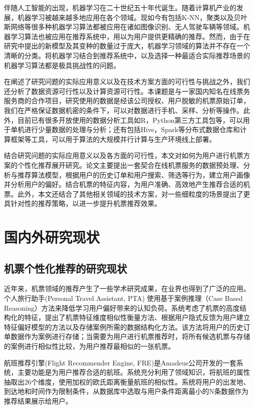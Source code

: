 伴随人工智能的出现，机器学习在二十世纪五十年代诞生。随着计算机产业的发展，机器学习被越来越多地应用在各个领域。现如今有包括K-NN，聚类以及贝叶斯网络等很多种机器学习算法都被应用在诸如图像识别、无人驾驶车辆等领域。机器学习算法也被应用在推荐系统中，用以为用户提供更精确的推荐。然而，由于在研究中提出的新模型及其变种的数量过于庞大，机器学习领域的算法并不存在一个清晰的分类。将机器学习结合到推荐系统中，以及选择一种最适合实际推荐场景的机器学习算法都是极具挑战性的问题。

在阐述了研究问题的实际应用意义以及在技术方案方面的可行性与挑战之外，我们还分析了数据资源可行性以及计算资源可行性。本课题是与一家国内知名在线票务服务商的合作项目，研究使用的数据是经该公司授权、用户脱敏的机票原始订单，我们在严格保证数据机密的条件下，可以对数据进行手机、采样、分析等操作。此外，目前已有很多开放使用的数据分析工具如R，Python第三方工具包等，可以用于单机进行少量数据的处理与分析；还有包括Hive，Spark等分布式数据仓库和计算框架等工具，可以用于算法的大规模并行计算与生产环境线上部署。

结合研究问题的实际应用意义以及各方面的可行性，本文对如何为用户进行机票方案的个性化推荐展开研究。论文主要提出一套契合在线机票服务的数据预处理、分析与推荐算法模型，根据用户的历史订单和用户搜索、筛选等行为，建立用户画像并分析用户的偏好。结合机票的特征内容，为用户准确、高效地产生推荐合适的机票。此外，本文还结合了其他相关领域的技术方案，对一些细粒度的场景提出了更具针对性的推荐策略，以进一步提升机票推荐效果。


\section{国内外研究现状}
\subsection{机票个性化推荐的研究现状}
近年来，机票领域的推荐产生了一些学术研究成果，在业界也得到了广泛的应用。个人旅行助手(Personal Travel Assistant, PTA) 使用基于案例推理（Case Based Reasoning）方法来降低学习用户偏好带来的认知负荷。系统考虑了机票的高度结构化的特征，提出了机票特征维度相似性衡量方法、根据用户隐式反馈为用户建立特征偏好模型的方法以及存储案例所需的数据结构化方法。该方法将用户的历史订单数据作为案例进行存储；当需要为用户进行机票推荐时，将所有候选机票与存储的案例进行相似性比较，为用户推荐最相似的一张机票。

航班推荐引擎(Flight Recommender Engine, FRE)是Amadeus公司开发的一套系统，主要功能是为用户推荐合适的航班。系统充分利用了领域知识，将航班的属性抽取出26个维度，使用加权的欧氏距离衡量航班的相似性。系统将用户的出发地、到达地和时间作为限制条件，从数据库中选取与用户条件距离最小的N条数据作为推荐结果展示给用户。

